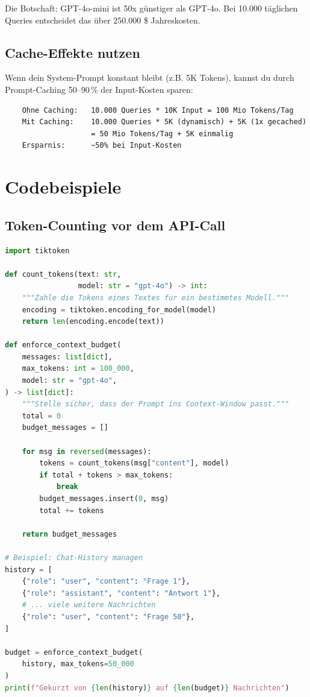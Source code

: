 Die Botschaft: GPT-4o-mini ist 50x günstiger als GPT-4o. Bei 10.000
täglichen Queries entscheidet das über 250.000 \$ Jahreskosten.

\subsection{Cache-Effekte nutzen}

Wenn dein System-Prompt konstant bleibt (z.B. 5K Tokens), kannst du
durch Prompt-Caching 50--90\,\% der Input-Kosten sparen:

\begin{verbatim}
    Ohne Caching:   10.000 Queries * 10K Input = 100 Mio Tokens/Tag
    Mit Caching:    10.000 Queries * 5K (dynamisch) + 5K (1x gecached)
                    = 50 Mio Tokens/Tag + 5K einmalig
    Ersparnis:      ~50% bei Input-Kosten
\end{verbatim}

\section{Codebeispiele}

\subsection{Token-Counting vor dem API-Call}

\begin{lstlisting}[language=Python, caption={Token-Counting mit tiktoken}, label=lst:token-counting]
import tiktoken

def count_tokens(text: str,
                 model: str = "gpt-4o") -> int:
    """Zahle die Tokens eines Textes fur ein bestimmtes Modell."""
    encoding = tiktoken.encoding_for_model(model)
    return len(encoding.encode(text))

def enforce_context_budget(
    messages: list[dict],
    max_tokens: int = 100_000,
    model: str = "gpt-4o",
) -> list[dict]:
    """Stelle sicher, dass der Prompt ins Context-Window passt."""
    total = 0
    budget_messages = []

    for msg in reversed(messages):
        tokens = count_tokens(msg["content"], model)
        if total + tokens > max_tokens:
            break
        budget_messages.insert(0, msg)
        total += tokens

    return budget_messages

# Beispiel: Chat-History managen
history = [
    {"role": "user", "content": "Frage 1"},
    {"role": "assistant", "content": "Antwort 1"},
    # ... viele weitere Nachrichten
    {"role": "user", "content": "Frage 50"},
]

budget = enforce_context_budget(
    history, max_tokens=50_000
)
print(f"Gekurzt von {len(history)} auf {len(budget)} Nachrichten")
\end{lstlisting}

